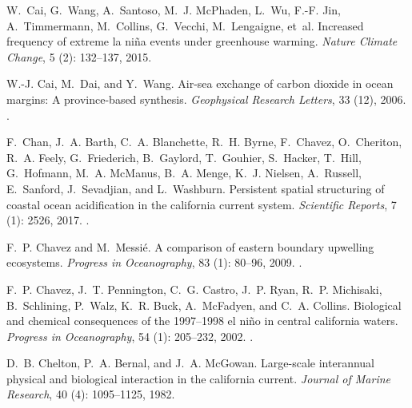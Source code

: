 \documentclass[hvmath, online,bgd]{copernicus_discussions}
\begin{document}
\begin{thebibliography}{84}
	W.~Cai, G.~Wang, A.~Santoso, M.~J. McPhaden, L.~Wu, F.-F. Jin, A.~Timmermann,
	M.~Collins, G.~Vecchi, M.~Lengaigne, et~al.
	\newblock Increased frequency of extreme la ni{\~n}a events under greenhouse
	warming.
	\newblock \emph{Nature Climate Change}, 5 (2): 132--137,
	2015.
	
	W.-J. Cai, M.~Dai, and Y.~Wang.
	\newblock Air-sea exchange of carbon dioxide in ocean margins: A province-based
	synthesis.
	\newblock \emph{Geophysical Research Letters}, 33 (12), 2006.
	\newblock {}.
	
	F.~Chan, J.~A. Barth, C.~A. Blanchette, R.~H. Byrne, F.~Chavez, O.~Cheriton,
	R.~A. Feely, G.~Friederich, B.~Gaylord, T.~Gouhier, S.~Hacker, T.~Hill,
	G.~Hofmann, M.~A. McManus, B.~A. Menge, K.~J. Nielsen, A.~Russell,
	E.~Sanford, J.~Sevadjian, and L.~Washburn.
	\newblock Persistent spatial structuring of coastal ocean acidification in the
	california current system.
	\newblock \emph{Scientific Reports}, 7 (1): 2526, 2017.
	\newblock {}.
	
	F.~P. Chavez and M.~Messi{\'e}.
	\newblock A comparison of eastern boundary upwelling ecosystems.
	\newblock \emph{Progress in Oceanography}, 83 (1): 80--96,
	2009.
	\newblock {}.
	
	F.~P. Chavez, J.~T. Pennington, C.~G. Castro, J.~P. Ryan, R.~P. Michisaki,
	B.~Schlining, P.~Walz, K.~R. Buck, A.~McFadyen, and C.~A. Collins.
	\newblock Biological and chemical consequences of the 1997--1998 el ni{\~n}o in
	central california waters.
	\newblock \emph{Progress in Oceanography}, 54 (1): 205--232,
	2002.
	\newblock {}.
	
	D.~B. Chelton, P.~A. Bernal, and J.~A. McGowan.
	\newblock Large-scale interannual physical and biological interaction in the
	california current.
	\newblock \emph{Journal of Marine Research}, 40 (4):
	1095--1125, 1982.
	

\end{thebibliography}
\end{document}
